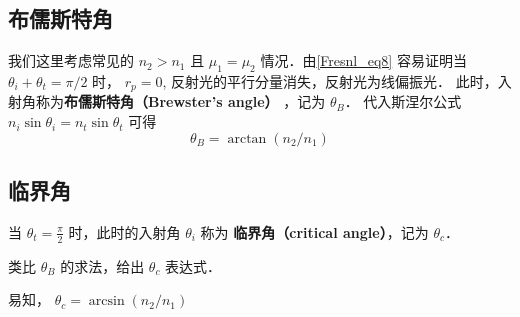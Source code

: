 \subsection{布儒斯特角}
我们这里考虑常见的 $n_2>n_1$ 且 $\mu_1 = \mu_2$ 情况．由\autoref{Fresnl_eq8} 容易证明当 $\theta_i + \theta_t = \pi/2$ 时， $r_p = 0$, 反射光的平行分量消失，反射光为线偏振光． 此时，入射角称为\textbf{布儒斯特角（Brewster's angle）} ，记为 $\theta_B$． 代入斯涅尔公式 $n_i\sin\theta_i = n_t\sin\theta_t$ 可得
\begin{equation}
\theta_B = \arctan (n_2/n_1)
\end{equation}

\subsection{临界角}
\begin{definition}{}
当 $\theta_t  = \frac{\pi}{2}$ 时，此时的入射角 $\theta_i$ 称为 \textbf{临界角（critical angle）}，记为 $\theta_c$．
\end{definition}

\begin{exercise}{}
类比 $\theta_B$ 的求法，给出 $\theta_c$ 表达式．
\end{exercise}

易知， $\theta_c = \arcsin(n_2/n_1)$


